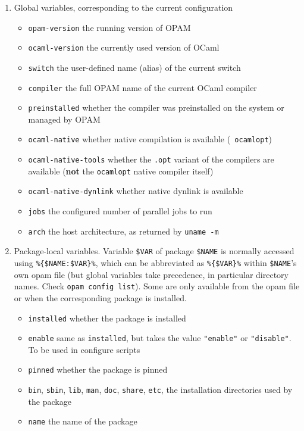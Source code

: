 \documentclass[a4paper,10pt]{article}
\begin{document}
\begin{enumerate}
\item Global variables, corresponding to the current configuration
  \begin{itemize}
  \item \verb+opam-version+ the running version of OPAM
  \item \verb+ocaml-version+ the currently used version of OCaml
  \item \verb+switch+ the user-defined name (alias) of the current switch
  \item \verb+compiler+ the full OPAM name of the current OCaml compiler
  \item \verb+preinstalled+ whether the compiler was preinstalled on the system
    or managed by OPAM
  \item \verb+ocaml-native+ whether native compilation is available ({\tt
      ocamlopt})
  \item \verb+ocaml-native-tools+ whether the {\tt .opt} variant of the
    compilers are available ({\bf not} the {\tt ocamlopt} native compiler itself)
  \item \verb+ocaml-native-dynlink+ whether native dynlink is available
  \item \verb+jobs+ the configured number of parallel jobs to run
  \item \verb+arch+ the host architecture, as returned by \verb+uname -m+
  \end{itemize}
\item Package-local variables. Variable \verb+$VAR+ of package \verb+$NAME+ is
  normally accessed using \verb+%{$NAME:$VAR}%+, which can be abbreviated as
  \verb+%{$VAR}%+ within \verb+$NAME+'s own opam file (but global variables take
  precedence, in particular directory names. Check \verb+opam config list+).
  Some are only available from the opam file or when the corresponding package
  is installed.
  \begin{itemize}
  \item \verb+installed+ whether the package is installed
  \item \verb+enable+ same as \verb+installed+, but takes the value
    \verb+"enable"+ or \verb+"disable"+. To be used in configure scripts
  \item \verb+pinned+ whether the package is pinned
  \item \verb+bin+, \verb+sbin+, \verb+lib+, \verb+man+, \verb+doc+,
    \verb+share+, \verb+etc+, the installation directories used by the package
  \item \verb+name+ the name of the package

\end{itemize}
\end{enumerate}
\end{document}
